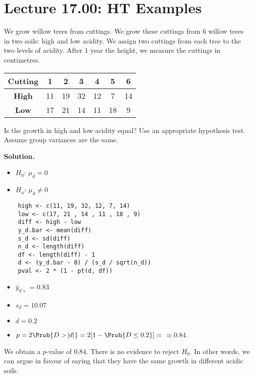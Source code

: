 \section{Lecture 17.00: HT Examples}
\begin{Example}{}{}
    We grow willow trees from cuttings. We grow these cuttings from 6 willow trees in
    two soils: high and low acidity. We assign two cuttings from each tree to the two levels of
    acidity. After 1 year the height, we measure the cuttings in centimetres.

    \begin{center}
        \begin{NiceTabular}{c|cccccc}
            \textbf{Cutting} & 1  & 2  & 3  & 4  & 5  & 6  \\
            \midrule
            \textbf{High}    & 11 & 19 & 32 & 12 & 7  & 14 \\
            \textbf{Low}     & 17 & 21 & 14 & 11 & 18 & 9
        \end{NiceTabular}
    \end{center}

    Is the growth in high and low acidity equal? Use an appropriate hypothesis test.
    Assume group variances are the same.

    \textbf{Solution.}
    \begin{itemize}
        \item $H_0$: $ \mu_d=0 $
        \item $H_a$: $ \mu_d\ne 0 $
    \end{itemize}
    \begin{verbatim}
    high <- c(11, 19, 32, 12, 7, 14)
    low <- c(17, 21 , 14 , 11 , 18 , 9)
    diff <- high - low
    y_d.bar <- mean(diff)
    s_d <- sd(diff)
    n_d <- length(diff)
    df <- length(diff) - 1
    d <- (y_d.bar - 0) / (s_d / sqrt(n_d))
    pval <- 2 * (1 - pt(d, df))
    \end{verbatim}
    \begin{itemize}
        \item $ \bar{y}_{d+}=0.83 $
        \item $ s_d=10.07 $
        \item $ d=0.2 $
        \item $ p=2\Prob{D>\abs{d}}=2[1-\Prob{D\le 0.2}]=$  $\approx
                  0.84$.
    \end{itemize}
    We obtain a $ p $-value of $ 0.84 $. There is no evidence to reject $ H_0 $.
    In other words, we can argue in favour of saying that they have the same
    growth in different acidic soils.
\end{Example}
